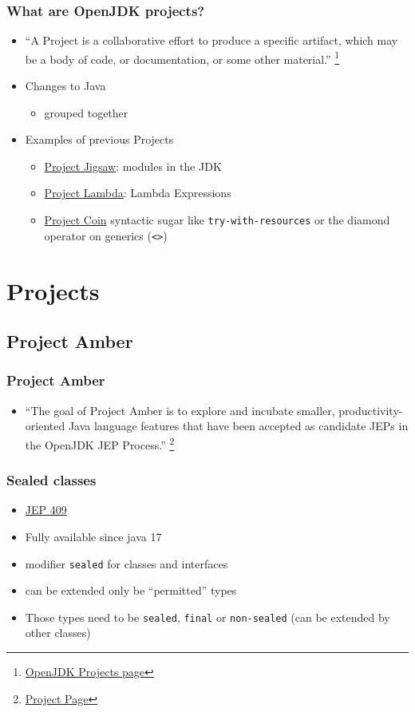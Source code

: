 \documentclass{beamer}
\begin{document}
\begin{frame}
\frametitle{What are OpenJDK projects?}
\begin{itemize}
  \item ``A Project is a collaborative effort to produce a specific artifact, which may be a body of code, or documentation, or some other material.''
  	\footnote{\href{https://openjdk.org/projects/}{OpenJDK Projects page}}
  \pause
  \item Changes to Java
  \begin{itemize}
    \item grouped together
  \end{itemize}
  \pause
  \item Examples of previous Projects
  \begin{itemize}
    \item \href{https://openjdk.org/projects/jigsaw/}{Project Jigsaw}:
    	modules in the JDK
    \item \href{https://openjdk.org/projects/lambda/}{Project Lambda}:
    	Lambda Expressions
    \item \href{https://openjdk.org/projects/coin/}{Project Coin}
    	syntactic sugar like \texttt{try-with-resources} or the diamond operator on generics (\texttt{<>})
  \end{itemize}
\end{itemize}
\end{frame}

\section{Projects}

\subsection{Project Amber}
\begin{frame}
\frametitle{Project Amber}
\begin{itemize}
  \item ``The goal of Project Amber is to explore and incubate smaller, productivity-oriented Java language features that have been accepted as candidate JEPs in the OpenJDK JEP Process.''
	\footnote{\href{https://openjdk.org/projects/amber/}{Project Page}}
\end{itemize}
\end{frame}

\begin{frame}
\frametitle{Sealed classes}
\begin{itemize}
  \item \href{https://openjdk.java.net/jeps/409}{JEP 409}
  \item Fully available since java 17
  \pause
  \item modifier \texttt{sealed} for classes and interfaces
  \item can be extended only be ``permitted'' types
  \item Those types need to be \texttt{sealed}, \texttt{final} or \texttt{non-sealed} (can be extended by other classes)
\end{itemize}
\end{frame}
\end{document}
